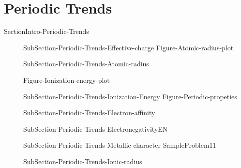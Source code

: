 \documentclass[main.tex]{subfiles}
\newcommand\chapterlabel{Ch-Table}\setcounter{figurenewcounter}{0}\setcounter{tablenewcounter}{0}\setcounter{formulanewcounter}{0}\chapterpicture{../{\chapterlabel}/figure1}\chapterpicturelabel{PxFuel}
\begin{document}
{\vspace{0cm}{Figure-Atomic-radius}

\section{Periodic Trends}{SectionIntro-Periodic-Trends}
\sloppy\begin{description}
\item[] {SubSection-Periodic-Trends-Effective-charge}
{Figure-Atomic-radius-plot}
\item[] {SubSection-Periodic-Trends-Atomic-radius}
 \hspace{-5cm}{Table-Ionization-energies}

{Figure-Ionization-energy-plot}
\item[] {SubSection-Periodic-Trends-Ionization-Energy}
{Figure-Periodic-propeties}
\item[] {SubSection-Periodic-Trends-Electron-affinity}
\item[] {SubSection-Periodic-Trends-ElectronegativityEN}
\item[]{SubSection-Periodic-Trends-Metallic-character}
{SampleProblem11}
\item[]  {SubSection-Periodic-Trends-Ionic-radius}
\end{description}



\renewcommand\chapterlabel{Ch-Table}
}{}






 \checkoddpage\ifoddpage \clearpage\thispagestyle{empty}\mbox{}\clearpage \else  \fi 
\end{document}
